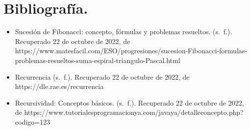 \documentclass{report}
\begin{document}
	\section*{Bibliografía.}
	\begin{itemize}
		\item \large Sucesión de Fibonacci: concepto, fórmulas y problemas resueltos. (s. f.). Recuperado 22 de octubre de 2022, de https://www.matesfacil.com/ESO/progresiones/sucesion-Fibonacci-formulas-problemas-resueltos-suma-espiral-triangulo-Pascal.html \par
		\item \large Recurrencia (s. f.). Recuperado 22 de octubre de 2022, de https://dle.rae.es/recurrencia\par 
		\item \large Recursividad: Conceptos básicos. (s. f.). Recuperado 22 de octubre de 2022, de https://www.tutorialesprogramacionya.com/javaya/detalleconcepto.php?codigo=123\par 
	\end{itemize}
\end{document}
